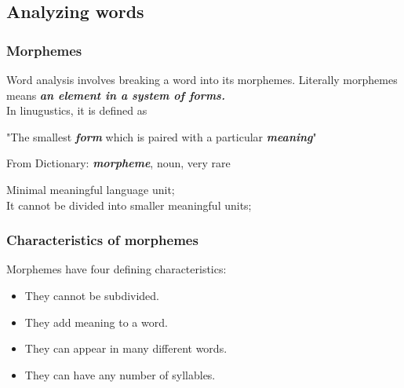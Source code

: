 \documentclass[12pt]{article}
\begin{document}
\subsection{Analyzing words}
\subsubsection{Morphemes}
Word analysis involves breaking a word into its morphemes. Literally morphemes means \textbf{\textit{an element in a system of forms.}}\\
In linugustics, it is defined as 
\begin{addmargin}[3em]{2em}%
"The smallest \textbf{\textit{form}} which is paired with a particular \textbf{\textit{meaning}}"
\end{addmargin} 
From Dictionary: \textbf{\textit{morpheme}}, noun, very rare\\
\begin{addmargin}[3em]{2em}%
	Minimal meaningful language unit;\\ 
	It cannot be divided into smaller meaningful units;
\end{addmargin}

\subsubsection{Characteristics of morphemes}
Morphemes have four defining characteristics:
\begin{itemize}
\item \color{blue} They cannot be subdivided.
\color{black} \item \color{blue} They add meaning to a word.
\color{black} \item \color{blue} They can appear in many different words.
\color{black} \item \color{blue} They can have any number of syllables.
\end{itemize}
\color{black}
\end{document}
